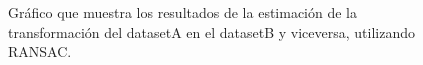 \begin{figure}[H]
\begin{center}
\hspace{0.5cm}

\end{center}

\caption{Gráfico que muestra los resultados de la estimación de la transformación del datasetA en el datasetB y viceversa, utilizando RANSAC.}
\end{figure}




